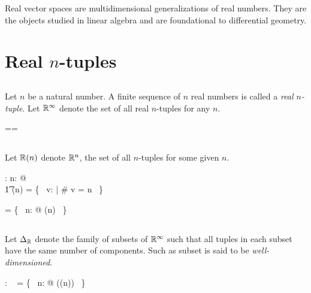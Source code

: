 \documentclass[11pt, oneside]{article}
\begin{document}
Real vector spaces are multidimensional generalizations of real numbers.
They are the objects studied in linear algebra and are foundational to differential geometry.

\section{Real $n$-tuples}

\subsection{}

Let $n$ be a natural number.
A finite sequence of $n$ real numbers is called a {\it real $n$-tuple}.
Let $\mathbb{R}^\infty$ denote the set of all real $n$-tuples for any $n$.

\begin{zed}
	\Rinf == \seq \R
\end{zed}

\subsection{}

Let $\mathbb{R}(n)$ denote $\mathbb{R}^n$, the set of all $n$-tuples for some given $n$.
\begin{axdef}
	\Rtuples: \nat \fun \power \Rinf
\where
	\forall n: \nat @ \\
	\t1	\Rtuples(n) = \{~ v: \Rinf | \# v = n ~\}
\end{axdef}

\begin{remark}

\begin{zed}
	\Rinf = \bigcup \{~ n: \nat @ \Rtuples(n) ~\}
\end{zed}

\end{remark}

\subsection{}

Let $\Delta_{\mathbb{R}}$ denote the family of subsets of $\mathbb{R}^\infty$ such that all tuples in each subset have the same number of components.
Such as subset is said to be {\it well-dimensioned}.

\begin{axdef}
	\DeltaR: \family~\Rinf
\where
	\DeltaR = \bigcup \{~ n: \nat @ \power(\Rtuples(n)) ~\}
\end{axdef}
\end{document}
